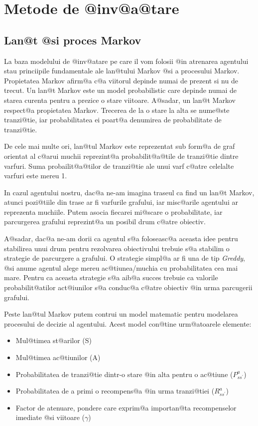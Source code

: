 \chapter{Metode de @inv@a@tare}

\section{Lan@t @si proces Markov}

La baza modelului de @inv@atare pe care il vom folosii @in atrenarea agentului stau princiipile fundamentale ale lan@tului Markov @si a procesului Markov.
Propietatea Markov afirm@a c@a viitorul depinde numai de prezent si nu de trecut. Un lan@t Markov este un model probabilistic care depinde numai de starea curenta pentru a prezice o stare viitoare. A@sadar, un lan@t Markov respect@a propietatea Markov.
Trecerea de la o stare la alta se nume@ste tranzi@tie, iar probabilitatea ei poart@a denumirea de probabilitate de tranzi@tie.

De cele mai multe ori, lan@tul Markov este reprezentat sub form@a de graf orientat al c@arui muchii reprezint@a probabilit@a@tile de tranzi@tie dintre varfuri. Suma probailit@a@tilor de tranzi@tie ale unui varf c@atre celelalte varfuri este mereu 1.

In cazul agentului nostru, dac@a ne-am imagina traseul ca find un lan@t Markov, atunci pozi@tiile din trase ar fi varfurile grafului, iar misc@arile agentului ar reprezenta muchiile. Putem asocia fiecarei mi@scare o probabilitate, iar parcurgerea grafului reprezint@a un posibil drum c@atre obiectiv.

A@sadar, dac@a ne-am dorii ca agentul s@a foloseasc@a aceasta idee pentru stabilirea unui drum pentru rezolvarea obiectivului trebuie s@a stabilim o strategie de parcurgere a grafului.
O strategie simpl@a ar fi una de tip {\sl Greddy}, @si anume agentul alege mereu ac@tiunea/muchia cu probabilitatea cea mai mare. Pentru ca aceasta strategie s@a aib@a succes trebuie ca valorile probabilit@atilor act@iunilor s@a conduc@a c@atre obiectiv @in urma parcugerii grafului.

Peste lan@tul Markov putem contrui un model matematic pentru modelarea procesului de decizie al agentului. Acest model con@tine urm@atoarele elemente:

\begin{itemize}
	\item Mul@timea st@arilor (S)
	\item Mul@timea ac@tiunilor (A)
	\item Probabilitatea de tranzi@tie dintr-o stare @in alta pentru o ac@tiune ($P_{s s^{\prime}}^a$)
	\item Probabilitatea de a primi o recompens@a @in urma tranzi@tiei ($R_{s s^{\prime}}^a$)
	\item Factor de atenuare, pondere care exprim@a importan@ta recompenselor imediate @si viitoare ($\gamma$)
\end{itemize}

